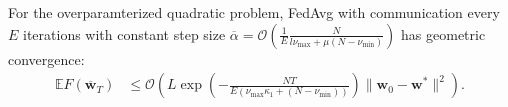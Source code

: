 \begin{comment}
In general $H$ has zero eigevalues. However, because the null space
of $H$ and range of $H$ are orthogonal, in our subsequence analysis
it suffices to project $\overline{\mathbf{w}}_{t}-\mathbf{w}^{\ast}$
onto the range of $H$, thus we may restrict to the non-zero eigenvalue
of $H$. We can use $\mathbf{w}^{\ast T}\mathbf{x}_{k}^{j}-z_{k}^{j}\equiv0$
to rewrite the local objectives as $F_{k}(\mathbf{w})=\frac{1}{2}\langle\mathbf{w}-\mathbf{w}^{\ast},H^{k}(\mathbf{w}-\mathbf{w}^{\ast})\rangle\equiv\frac{1}{2}\|\mathbf{w}-\mathbf{w}^{\ast}\|_{H^{k}}^{2}$
so that $F(\mathbf{w})=\frac{1}{2}\|\mathbf{w}-\mathbf{w}^{\ast}\|_{H}^{2}$.
\end{comment}
\begin{comment}
\begin{align*}
F_{k}(w) & =\frac{1}{2n_{k}}\sum_{j=1}^{n_{k}}(w^{T}x_{k,j}-z_{k,j}-(w^{\ast T}x_{k,j}-z_{k,j}))^{2}=\frac{1}{2n_{k}}\sum_{j=1}^{n_{k}}((w-w^{\ast})^{T}x_{k,j})^{2}\\
& =\frac{1}{2}\langle w-w^{\ast},H^{k}(w-w^{\ast})\rangle=\frac{1}{2}\|w-w^{\ast}\|_{H^{k}}^{2}
\end{align*}
\end{comment}
\begin{comment}
Let $\xi_{t}^{k}$ be the stochastic sample on the $k$th device at
time $t$, and define $\tilde{H}_{t}^{k}:=\xi_{t}^{k}(\xi_{t}^{k})^{T}$
as the stochastic Hessian matrix. %
\end{comment}
\begin{comment}
Note that $\mathbb{E}\tilde{H}_{t}^{k}=\frac{1}{n_{k}}\sum_{j=1}^{n_{k}}\mathbf{x}_{k}^{j}(\mathbf{x}_{k}^{j})^{T}=H^{k}$
and $\mathbf{g}_{t,k}=\nabla F_{k}(\mathbf{w}_{t}^{k},\xi_{t}^{k})=\tilde{H}_{t}^{k}(\mathbf{w}_{t}^{k}-\mathbf{w}^{\ast})$
while $\mathbf{g}_{t}=\sum_{k=1}^{N}p_{k}\nabla F_{k}(\mathbf{w}_{t}^{k},\xi_{t}^{k})=\sum_{k=1}^{N}p_{k}\tilde{H}_{t}^{k}(\mathbf{w}_{t}^{k}-\mathbf{w}^{\ast})$.
\end{comment}

\begin{theorem}
	\label{thm:overparameterized_quadratic}For the overparamterized quadratic
	problem, FedAvg with communication every $E$
	iterations with constant step size $\overline{\alpha}=\mathcal{O}(\frac{1}{E}\frac{N}{l\nu_{\max}+\mu(N-\nu_{\min})})$
	has geometric convergence:
	\begin{align*}
	\mathbb{E}F(\overline{\mathbf{w}}_{T}) & \leq\mathcal{O}\left(L\exp(-\frac{NT}{E(\nu_{\max}\kappa_{1}+(N-\nu_{\min}))})\|\mathbf{w}_{0}-\mathbf{w}^{\ast}\|^{2}\right).
	\end{align*}
\end{theorem}

